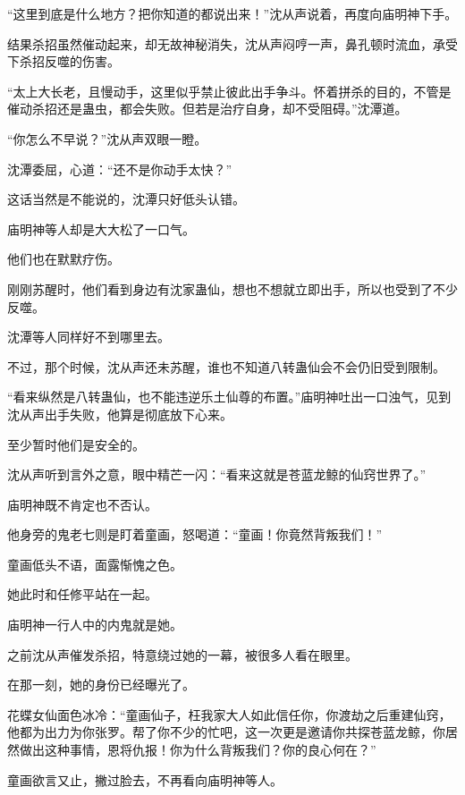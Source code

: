 
\begin{this_body}



“这里到底是什么地方？把你知道的都说出来！”沈从声说着，再度向庙明神下手。

结果杀招虽然催动起来，却无故神秘消失，沈从声闷哼一声，鼻孔顿时流血，承受下杀招反噬的伤害。

“太上大长老，且慢动手，这里似乎禁止彼此出手争斗。怀着拼杀的目的，不管是催动杀招还是蛊虫，都会失败。但若是治疗自身，却不受阻碍。”沈潭道。

“你怎么不早说？”沈从声双眼一瞪。

沈潭委屈，心道：“还不是你动手太快？”

这话当然是不能说的，沈潭只好低头认错。

庙明神等人却是大大松了一口气。

他们也在默默疗伤。

刚刚苏醒时，他们看到身边有沈家蛊仙，想也不想就立即出手，所以也受到了不少反噬。

沈潭等人同样好不到哪里去。

不过，那个时候，沈从声还未苏醒，谁也不知道八转蛊仙会不会仍旧受到限制。

“看来纵然是八转蛊仙，也不能违逆乐土仙尊的布置。”庙明神吐出一口浊气，见到沈从声出手失败，他算是彻底放下心来。

至少暂时他们是安全的。

沈从声听到言外之意，眼中精芒一闪：“看来这就是苍蓝龙鲸的仙窍世界了。”

庙明神既不肯定也不否认。

他身旁的鬼老七则是盯着童画，怒喝道：“童画！你竟然背叛我们！”

童画低头不语，面露惭愧之色。

她此时和任修平站在一起。

庙明神一行人中的内鬼就是她。

之前沈从声催发杀招，特意绕过她的一幕，被很多人看在眼里。

在那一刻，她的身份已经曝光了。

花蝶女仙面色冰冷：“童画仙子，枉我家大人如此信任你，你渡劫之后重建仙窍，他都为出力为你张罗。帮了你不少的忙吧，这一次更是邀请你共探苍蓝龙鲸，你居然做出这种事情，恩将仇报！你为什么背叛我们？你的良心何在？”

童画欲言又止，撇过脸去，不再看向庙明神等人。


\end{this_body}
